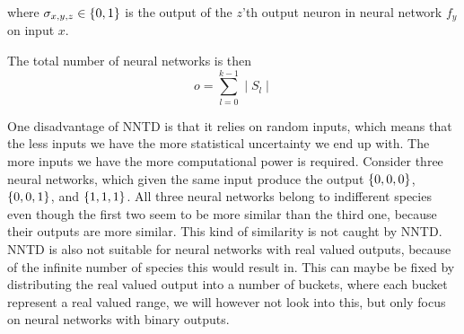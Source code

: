 where $\sigma_{x,y,z} \in \{ 0, 1 \}$ is the output of the $z$'th output neuron in neural network $f_y$ on input $x$.

The total number of neural networks is then
%
\[
  o = \sum\limits_{l = 0}^{k-1} \mid S_l \mid
\]
%

One disadvantage of NNTD is that it relies on random inputs, which means that the less inputs we have the more statistical uncertainty we end up with. The more inputs we have the more computational power is required. Consider three neural networks, which given the same input produce the output $\{ 0, 0, 0 \}$, $\{ 0, 0, 1 \}$, and $\{ 1, 1, 1 \}$. All three neural networks belong to indifferent species even though the first two seem to be more similar than the third one, because their outputs are more similar. This kind of similarity is not caught by NNTD\@. NNTD is also not suitable for neural networks with real valued outputs, because of the infinite number of species this would result in. This can maybe be fixed by distributing the real valued output into a number of buckets, where each bucket represent a real valued range, we will however not look into this, but only focus on neural networks with binary outputs.

